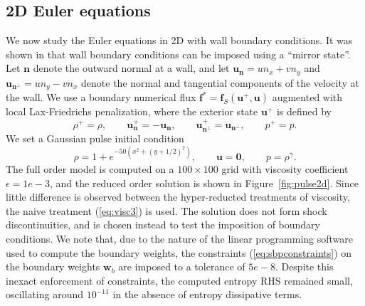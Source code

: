 \documentclass[preprint,10pt]{elsarticle}
\theoremstyle{definition}
\theoremstyle{lemma}
\theoremstyle{theorem}
\theoremstyle{assumption}
\newcommand{\LRp}[1]{\left( #1 \right)}
\begin{document}



\subsection{2D Euler equations}%

We now study the Euler equations in 2D with wall boundary conditions.  It was shown in \cite{svard2014entropy, chen2017entropy} that wall boundary conditions can be imposed using a ``mirror state''.  Let $\bm{n}$ denote the outward normal at a wall, and let $\bm{u}_{\bm{n}} = un_x + vn_y$ and $\bm{u}_{\bm{n}^\perp} = un_y - vn_x$ denote the normal and tangential components of the velocity at the wall.  We use a boundary numerical flux $\bm{f}^* = \bm{f}_S\LRp{\bm{u}^+,\bm{u}}$ augmented with local Lax-Friedrichs penalization, where the exterior state $\bm{u}^+$ is defined by
\[
\rho^+ = \rho, \qquad \bm{u}_{\bm{n}}^+ = -\bm{u}_{\bm{n}}, \qquad \bm{u}_{\bm{n}^\perp}^+ = \bm{u}_{\bm{n}^\perp}, \qquad p^+ = p.  
\]
We set a Gaussian pulse initial condition 
\[
\rho = 1 + e^{-50\LRp{x^2+(y+1/2)^2}}, \qquad \bm{u} = \bm{0}, \qquad p = \rho^{\gamma}.  
\]
The full order model is computed on a $100\times 100$ grid with viscosity coefficient $\epsilon = 1e-3$, and the reduced order solution is shown in Figure~\ref{fig:pulse2d}. Since little difference is observed between the hyper-reducted treatments of viscosity,  the naive treatment (\ref{eq:visc3}) is used.  The solution does not form shock discontinuities, and is chosen instead to test the imposition of boundary conditions.  We note that, due to the nature of the linear programming software used to compute the boundary weights, the constraints (\ref{eq:sbpconstraints}) on the boundary weights $\bm{w}_b$ are imposed to a tolerance of $5e-8$.  Despite this inexact enforcement of constraints, the computed entropy RHS remained small, oscillating around $10^{-11}$ in the absence of entropy dissipative terms.  
\end{document}
